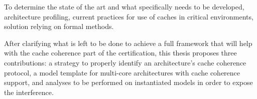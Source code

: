 To determine the state of the art and what specifically needs to be developed,
architecture profiling, current practices for use of
caches in critical environments, solution relying on formal methods.

After clarifying what is left to be done to achieve a full framework that will
help with the cache coherence part of the certification, this thesis proposes
three contributions: a strategy to properly identify an architecture's cache
coherence protocol, a model template for multi-core architectures with cache
coherence support, and analyses to be performed on instantiated models in order
to expose the interference.
